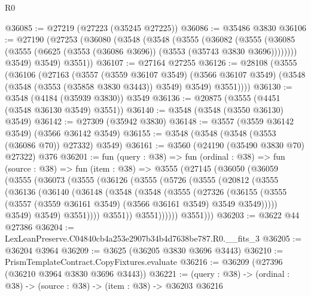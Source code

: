 \begin{lexlean}{R0}
\begin{coremodule}
@36085 := @27219 (@27223 (@35245 @27225))
@36086 := @35486 @3830
@36106 := @27190
    (@27253
      (@36080
        (@3548
          (@3548
            (@3555
              (@36082
                (@3555
                  (@36085 (@3555 (@6625 (@3553 (@36086 @3696)) (@3553 (@35743 @3830 @3696))))))))
            @3549)
          @3549)
        @3551))
@36107 := @27164 @27255
@36126 := @28108
    (@3555
      (@36106
        (@27163
          (@3557
            (@3559 @36107 @3549)
            (@3566 @36107 @3549)
            (@3548 (@3548 (@3553 (@35858 @3830 @3443)) @3549) @3549)
            @3551))))
@36130 := @3548 (@4184 (@35939 @3830)) @3549
@36136 := @20875 (@3555 (@4451 (@3548 @36130 @3549) @3551))
@36140 := @3548 (@3548 (@3550 @36130) @3549)
@36142 := @27309 (@35942 @3830)
@36148 := @3557 (@3559 @36142 @3549) (@3566 @36142 @3549)
@36155 := @3548 (@3548 (@3548 (@3553 (@36086 @70)) @27332) @3549)
@36161 := @3560 (@24190 (@35490 @3830 @70) @27322) @376
@36201 := fun (query : @38) =>
  fun (ordinal : @38) =>
  fun (source : @38) =>
  fun (item : @38) =>
  @3555
    (@27145
      (@36050
        (@36059
          (@3555
            (@36073
              (@3555
                (@36126
                  (@3555
                    (@5726
                      (@3555
                        (@20812
                          (@3555
                            (@36136
                              (@36140
                                (@36148
                                  (@3548
                                    (@3548
                                      (@3555
                                        (@27326
                                          (@36155
                                            (@3555
                                              (@3557
                                                (@3559 @36161 @3549)
                                                (@3566 @36161 @3549)
                                                @3549
                                                @3549)))))
                                      @3549)
                                    @3549)
                                  @3551))))
                          @3551))
                      @3551))))))
          @3551)))
@36203 := @3622 @44 @27386
@36204 := LexLeanPreserve.C04840cb4a253e2907b34b4d7638be787.R0.__fits_3
@36205 := @36204 @3964
@36209 := @3625 (@36205 @3830 @3696 @3443)
@36210 := PrismTemplateContract.CopyFixtures.evaluate
@36216 := @36209 (@27396 (@36210 @3964 @3830 @3696 @3443))
@36221 := (query : @38) -> (ordinal : @38) -> (source : @38) -> (item : @38) -> @36203 @36216

\end{coremodule}
\end{lexlean}
